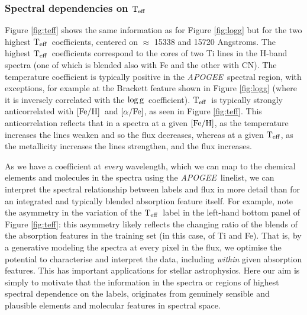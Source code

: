 \documentclass[12pt, preprint]{aastex}
\newcommand{\project}[1]{\textsl{#1}}
\newcommand{\apogee}{\project{APOGEE}}
\newcommand{\teff}{\mbox{$\rm T_{eff}$}}
\newcommand{\feh}{\mbox{$\rm [Fe/H]$}}
\newcommand{\alphafe}{\mbox{$\rm [\alpha/Fe]$}}
\newcommand{\logg}{\mbox{$\rm \log g$}}
\begin{document}
\subsubsection{Spectral dependencies on \teff} 

Figure \ref{fig:teff} shows the same information as for Figure \ref{fig:logg} but for the two highest \teff\ coefficients, centered on $\approx$ 15338 and 15720 Angstroms. The highest \teff\ coefficients correspond to the cores of two Ti lines in the H-band spectra (one of which is blended also with Fe and the other with CN). The temperature coefficient is typically positive in the \apogee\ spectral region, with exceptions, for example at the Brackett feature shown in Figure \ref{fig:logg} (where it is inversely correlated with the \logg\ coefficient). \teff\ is typically strongly anticorrelated with \feh\ and \alphafe, as seen in Figure \ref{fig:teff}. This anticorrelation reflects that in a spectra at a given \feh, as the temperature increases the lines weaken and so the flux decreases, whereas at a given \teff, as the metallicity increases the lines strengthen, and the flux increases. 

As we have a coefficient at \textit{every} wavelength, which we can map to the chemical elements and molecules in the spectra using the \apogee\ linelist, we can interpret the spectral relationship between labels and flux in more detail than for an integrated and typically blended absorption feature itself.  For example, note the asymmetry in the variation of the \teff\ label in the left-hand bottom panel of Figure \ref{fig:teff}: this asymmetry likely reflects the changing ratio of the blends of the absorption features in the training set (in this case, of Ti and Fe). That is, by a generative modeling the spectra at every pixel in the flux, we optimise the potential to characterise and interpret the data, including \textit{within} given absorption features. This  has important applications for stellar astrophysics. Here our aim is simply to motivate that the information in the spectra or regions of highest spectral dependence on the labels, originates from genuinely sensible and plausible elements and molecular features in spectral space.  

\end{document}
